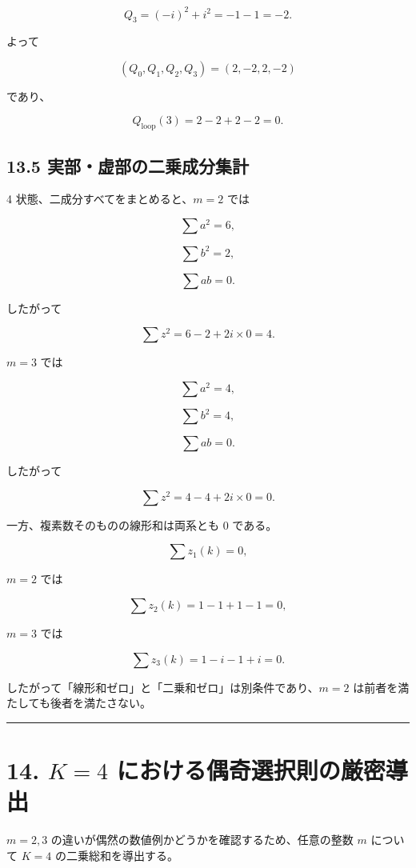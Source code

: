 \documentclass[
  a4paper,
]{ltjsarticle}
\begin{document}
\[
Q_3
=
(-i)^2+i^2
=
-1-1
=
-2.
\]

よって

\[
\boxed{
(Q_0,Q_1,Q_2,Q_3)
=
(2,-2,2,-2)
}
\]

であり、

\[
Q_{\mathrm{loop}}(3)
=
2-2+2-2
=
\boxed{0}.
\]

\subsection{13.5
実部・虚部の二乗成分集計}\label{ux5b9fux90e8ux865aux90e8ux306eux4e8cux4e57ux6210ux5206ux96c6ux8a08}

4 状態、二成分すべてをまとめると、\(m=2\) では

\[
\sum a^2=6,
\]

\[
\sum b^2=2,
\]

\[
\sum ab=0.
\]

したがって

\[
\sum z^2
=
6-2+2i\times0
=
4.
\]

\(m=3\) では

\[
\sum a^2=4,
\]

\[
\sum b^2=4,
\]

\[
\sum ab=0.
\]

したがって

\[
\sum z^2
=
4-4+2i\times0
=
0.
\]

一方、複素数そのものの線形和は両系とも 0 である。

\[
\sum z_1(k)=0,
\]

\(m=2\) では

\[
\sum z_2(k)
=
1-1+1-1
=
0,
\]

\(m=3\) では

\[
\sum z_3(k)
=
1-i-1+i
=
0.
\]

したがって「線形和ゼロ」と「二乗和ゼロ」は別条件であり、\(m=2\)
は前者を満たしても後者を満たさない。

\begin{center}\rule{0.5\linewidth}{0.5pt}\end{center}

\section{\texorpdfstring{14. \(K=4\)
における偶奇選択則の厳密導出}{14. K=4 における偶奇選択則の厳密導出}}\label{k4-ux306bux304aux3051ux308bux5076ux5947ux9078ux629eux5247ux306eux53b3ux5bc6ux5c0eux51fa}

\(m=2,3\) の違いが偶然の数値例かどうかを確認するため、任意の整数 \(m\)
について \(K=4\) の二乗総和を導出する。
\end{document}
